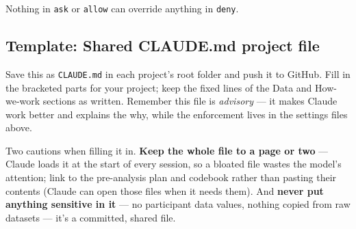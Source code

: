 \documentclass[
]{book}
\begin{document}
Nothing in \texttt{ask} or \texttt{allow} can override anything in \texttt{deny}.

\subsection{Template: Shared CLAUDE.md project file}\label{template-shared-claude.md-project-file}

Save this as \texttt{CLAUDE.md} in each project's root folder and push it to
GitHub. Fill in the bracketed parts for your project; keep the
fixed lines of the Data and How-we-work sections as written. Remember
this file is \emph{advisory} --- it makes
Claude work better and explains the why, while the enforcement lives
in the settings files above.

Two cautions when filling it in. \textbf{Keep the whole file to a page or
two} --- Claude loads it at the start of every session, so a bloated
file wastes the model's attention; link to the pre-analysis plan and
codebook rather than pasting their contents (Claude can open those
files when it needs them). And \textbf{never put anything sensitive in it}
--- no participant data values, nothing copied from raw datasets --- it's
a committed, shared file.
\end{document}
